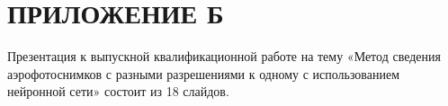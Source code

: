 \chapter*{ПРИЛОЖЕНИЕ Б}

Презентация к выпускной квалификационной работе на тему «Метод сведения аэрофотоснимков с разными разрешениями к
одному с использованием нейронной сети» состоит из 18 слайдов.